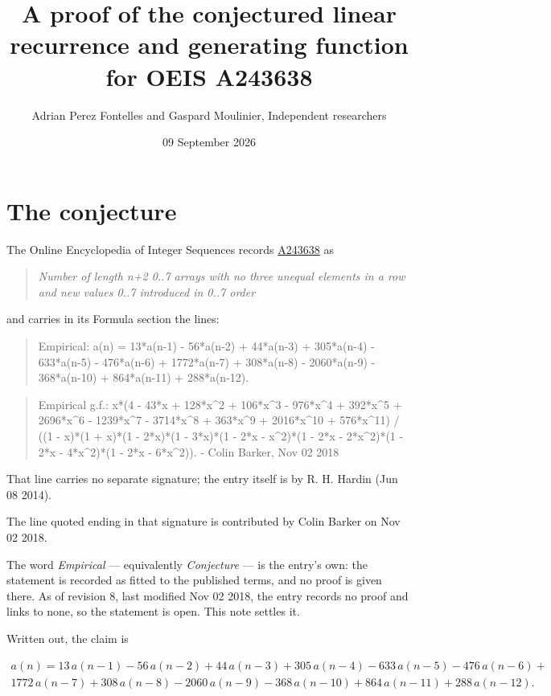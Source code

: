 \documentclass[11pt]{article}
\title{A proof of the conjectured linear recurrence and generating function for OEIS A243638}
\author{Adrian Perez Fontelles and Gaspard Moulinier, Independent researchers}
\date{09 September 2026}
\theoremstyle{definition}
\begin{document}
\maketitle
\section{The conjecture}

The Online Encyclopedia of Integer Sequences records \href{https://oeis.org/A243638}{A243638} as

\begin{quote}\itshape Number of length n+2 0..7 arrays with no three unequal elements in a row and new values 0..7 introduced in 0..7 order\end{quote}

and carries in its Formula section the lines:

\begin{quote}\ttfamily Empirical: a(n) = 13*a(n-1) - 56*a(n-2) + 44*a(n-3) + 305*a(n-4) - 633*a(n-5) - 476*a(n-6) + 1772*a(n-7) + 308*a(n-8) - 2060*a(n-9) - 368*a(n-10) + 864*a(n-11) + 288*a(n-12).\end{quote}

\begin{quote}\ttfamily Empirical g.f.: x*(4 - 43*x + 128*x\textasciicircum{}2 + 106*x\textasciicircum{}3 - 976*x\textasciicircum{}4 + 392*x\textasciicircum{}5 + 2696*x\textasciicircum{}6 - 1239*x\textasciicircum{}7 - 3714*x\textasciicircum{}8 + 363*x\textasciicircum{}9 + 2016*x\textasciicircum{}10 + 576*x\textasciicircum{}11) / ((1 - x)*(1 + x)*(1 - 2*x)*(1 - 3*x)*(1 - 2*x - x\textasciicircum{}2)*(1 - 2*x - 2*x\textasciicircum{}2)*(1 - 2*x - 4*x\textasciicircum{}2)*(1 - 2*x - 6*x\textasciicircum{}2)). - Colin Barker, Nov 02 2018\end{quote}

That line carries no separate signature; the entry itself is by R. H. Hardin (Jun 08 2014).

The line quoted ending in that signature is contributed by Colin Barker on Nov 02 2018.

The word {\itshape Empirical} --- equivalently {\itshape Conjecture} --- is the entry's own: the statement is recorded as fitted to the published terms, and no proof is given there. As of revision 8, last modified Nov 02 2018, the entry records no proof and links to none, so the statement is open. This note settles it.

Written out, the claim is

\begin{multline*} a(n) = 13\,a(n-1) - 56\,a(n-2) + 44\,a(n-3) + 305\,a(n-4) - 633\,a(n-5) - 476\,a(n-6) + \\ 1772\,a(n-7) + 308\,a(n-8) - 2060\,a(n-9) - 368\,a(n-10) + 864\,a(n-11) + 288\,a(n-12). \end{multline*}
\end{document}
